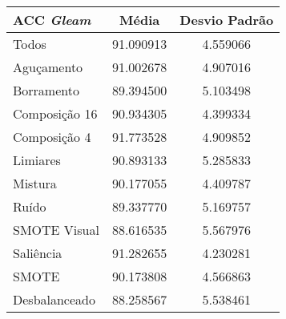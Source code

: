 
\begin{table}[!htbp]
\centering
\caption{}
\label{tab:resultados:x:melhor}
\begin{tabular}{|l|c|c|}
\hline
\textbf{ACC \emph{Gleam}} & \textbf{Média}     & \textbf{Desvio Padrão} \\ \hline
   Todos         &  91.090913 &  4.559066  \\ \hline
  Aguçamento     &  91.002678 &  4.907016  \\ \hline
  Borramento     &  89.394500 &  5.103498  \\ \hline
  Composição 16  &  90.934305 &  4.399334  \\ \hline
  Composição 4   &  91.773528 &  4.909852  \\ \hline
  Limiares       &  90.893133 &  5.285833  \\ \hline
  Mistura        &  90.177055 &  4.409787  \\ \hline
  Ruído          &  89.337770 &  5.169757  \\ \hline
  SMOTE Visual   &  88.616535 &  5.567976  \\ \hline
  Saliência      &  91.282655 &  4.230281  \\ \hline
 SMOTE           &  90.173808 &  4.566863  \\ \hline
Desbalanceado    &  88.258567 &  5.538461  \\ \hline
\end{tabular}
\end{table}


